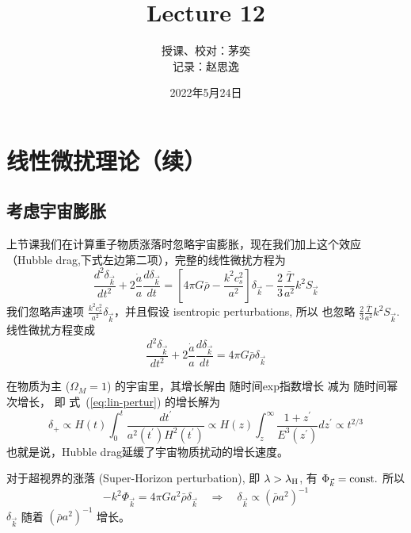 \documentclass[12pt]{ctexart}
\title{Lecture 12}
\author{授课、校对：茅奕  \\ 记录：赵思逸}
\date{2022年5月24日}
\newcommand{\refeq}[1]{式~(\ref{#1})}
\begin{document}
\maketitle

\section{线性微扰理论（续）}

\subsection{考虑宇宙膨胀}

上节课我们在计算重子物质涨落时忽略宇宙膨胀，现在我们加上这个效应（Hubble drag,下式左边第二项），完整的线性微扰方程为
\begin{equation} \label{eq:lin-pertur_Fouri}
    \frac{d^2 \delta_{\vec{k}}}{dt^2 } + 2\frac{\dot{a}}{a} \frac{d\delta_{\vec{k}}}{dt} = \left[4\pi G \bar{\rho}-\frac{k^2c_s^2}{a^2}\right] \delta_{\vec{k}} -\frac{2}{3}\frac{\bar{T}}{a^2}k^2 S_{\vec{k}}
\end{equation}
我们忽略声速项 $\frac{k^2c_s^2}{a^2} \delta_{\vec{k}}$，并且假设 isentropic perturbations, 所以 也忽略 $\frac{2}{3}\frac{\bar{T}}{a^2}k^2 S_{\vec{k}}$. 
线性微扰方程变成
\begin{equation} \label{eq:lin-pertur}
    \frac{d^2 \delta_{\vec{k}}}{dt^2 } + 2\frac{\dot{a}}{a} \frac{d\delta_{\vec{k}}}{dt} = 4\pi G \bar{\rho} \delta_{\vec{k}} 
\end{equation}

在物质为主 ($\Omega_M=1$) 的宇宙里，其增长解由 随时间exp指数增长 减为 随时间幂次增长，
即
\refeq{eq:lin-pertur} 的增长解为
\begin{equation}
    \delta_{+} \propto H(t) \int_{0}^{t} \frac{d t^{\prime}}{a^{2}\left(t^{\prime}\right) H^{2}\left(t^{\prime}\right)} \propto H(z) \int_{z}^{\infty} \frac{1+z^{\prime}}{E^{3}\left(z^{\prime}\right)} d z^{\prime} \propto t^{2/3}
\end{equation}
也就是说，Hubble drag延缓了宇宙物质扰动的增长速度。

对于超视界的涨落 (Super-Horizon perturbation), 即 $\lambda > \lambda_{\rm{H}}$,
有 $\Phi_{\vec{k}}=\rm{const.}$
所以 
\begin{equation}
    -k^{2} \Phi_{\vec{k}}=4 \pi G a^{2} \bar{\rho} \delta_{\vec{k}} \quad \Rightarrow \quad \delta_{\vec{k}} \propto\left(\bar{\rho} a^{2}\right)^{-1}
\end{equation}
$\delta_{\vec{k}}$ 随着 $\left(\bar{\rho} a^{2}\right)^{-1}$ 增长。
\end{document}
